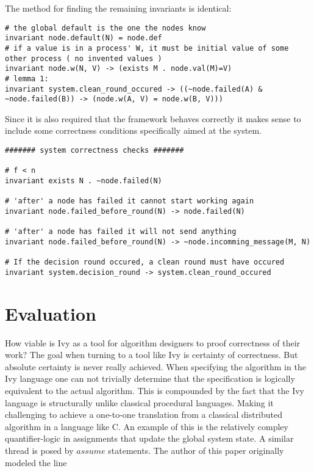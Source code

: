 \documentclass[fleqn]{article}
\begin{document}
The method for finding the remaining invariants is identical:
\begin{mdframed}[backgroundcolor=light-gray, roundcorner=10pt,leftmargin=1, rightmargin=1, innerleftmargin=5, innertopmargin=15,innerbottommargin=15, outerlinewidth=1, linecolor=light-gray]
\begin{lstlisting}
# the global default is the one the nodes know
invariant node.default(N) = node.def
# if a value is in a process' W, it must be initial value of some other process ( no invented values )
invariant node.w(N, V) -> (exists M . node.val(M)=V)
# lemma 1:
invariant system.clean_round_occured -> ((~node.failed(A) & ~node.failed(B)) -> (node.w(A, V) = node.w(B, V)))
\end{lstlisting}
\end{mdframed}



Since it is also required that the framework behaves correctly it makes sense to include some
correctness conditions specifically aimed at the system.

\begin{mdframed}[backgroundcolor=light-gray, roundcorner=10pt,leftmargin=1, rightmargin=1, innerleftmargin=5, innertopmargin=15,innerbottommargin=15, outerlinewidth=1, linecolor=light-gray]
\begin{lstlisting}
####### system correctness checks #######

# f < n
invariant exists N . ~node.failed(N)

# 'after' a node has failed it cannot start working again
invariant node.failed_before_round(N) -> node.failed(N)

# 'after' a node has failed it will not send anything
invariant node.failed_before_round(N) -> ~node.incomming_message(M, N)

# If the decision round occured, a clean round must have occured
invariant system.decision_round -> system.clean_round_occured

\end{lstlisting}
\end{mdframed}



\section{Evaluation}


How viable is Ivy as a tool for algorithm designers to proof correctness
of their work? The goal when turning to a tool like Ivy is certainty of
correctness. But absolute certainty is never really achieved. When specifying the
algorithm in the Ivy language one can not trivially determine that the specification
is logically equivalent to the actual algorithm. This is compounded by the fact
that the Ivy language is structurally unlike classical procedural languages. Making it challenging to achieve a one-to-one translation from a classical distributed algorithm in a language like C. An example of this is the relatively compley quantifier-logic in assignments that update the global system state.  A similar thread is posed by $assume$ statements. The author of this paper originally modeled the line
\end{document}
